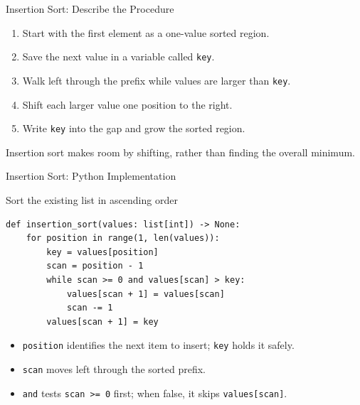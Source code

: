 \documentclass[aspectratio=169,10pt]{beamer}
\begin{document}
\begin{frame}{Insertion Sort: Describe the Procedure}
\small
\begin{enumerate}
 \item Start with the first element as a one-value sorted region.
 \item Save the next value in a variable called \texttt{key}.
 \item Walk left through the prefix while values are larger than \texttt{key}.
 \item Shift each larger value one position to the right.
 \item Write \texttt{key} into the gap and grow the sorted region.
\end{enumerate}
\begin{keyidea}Insertion sort makes room by shifting, rather than finding the overall minimum.\end{keyidea}
\end{frame}

\begin{frame}[fragile]{Insertion Sort: Python Implementation}
\small
\begin{block}{Sort the existing list in ascending order}
\footnotesize
\begin{verbatim}
def insertion_sort(values: list[int]) -> None:
    for position in range(1, len(values)):
        key = values[position]
        scan = position - 1
        while scan >= 0 and values[scan] > key:
            values[scan + 1] = values[scan]
            scan -= 1
        values[scan + 1] = key
\end{verbatim}
\end{block}
\begin{itemize}
 \item \texttt{position} identifies the next item to insert; \texttt{key} holds it safely.
 \item \texttt{scan} moves left through the sorted prefix.
 \item \texttt{and} tests \texttt{scan >= 0} first; when false, it skips \texttt{values[scan]}.
\end{itemize}
\end{frame}
\end{document}

